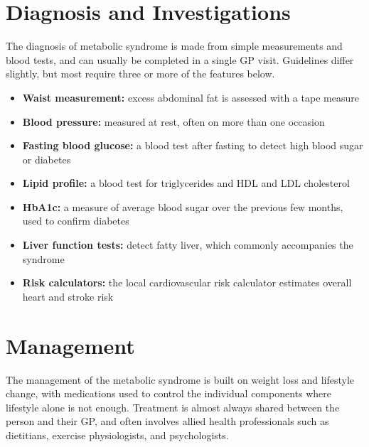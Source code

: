 \section*{Diagnosis and Investigations}
The diagnosis of metabolic syndrome is made from simple measurements and blood tests, and can usually be completed in a single GP visit. Guidelines differ slightly, but most require three or more of the features below.

\begin{itemize}
    \item \textbf{Waist measurement:} excess abdominal fat is assessed with a tape measure
    \item \textbf{Blood pressure:} measured at rest, often on more than one occasion
    \item \textbf{Fasting blood glucose:} a blood test after fasting to detect high blood sugar or diabetes
    \item \textbf{Lipid profile:} a blood test for triglycerides and HDL and LDL cholesterol
    \item \textbf{HbA1c:} a measure of average blood sugar over the previous few months, used to confirm diabetes
    \item \textbf{Liver function tests:} detect fatty liver, which commonly accompanies the syndrome
    \item \textbf{Risk calculators:} the local cardiovascular risk calculator estimates overall heart and stroke risk
\end{itemize}

\section*{Management}
The management of the metabolic syndrome is built on weight loss and lifestyle change, with medications used to control the individual components where lifestyle alone is not enough. Treatment is almost always shared between the person and their GP, and often involves allied health professionals such as dietitians, exercise physiologists, and psychologists.

